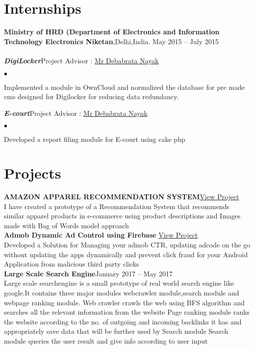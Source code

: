\documentclass[margin,line]{res}
\newenvironment{list2}{
  \begin{list}{$\bullet$}{%
      \setlength{\itemsep}{0in}
      \setlength{\parsep}{0in} \setlength{\parskip}{0in}
      \setlength{\topsep}{0in} \setlength{\partopsep}{0in}
      \setlength{\leftmargin}{0.2in}}}{\end{list}}
\begin{document}
\begin{resume}
\section{\sc Internships}
{\bf 
Ministry of HRD (Department of Electronics and Information Technology Electronics Niketan},Delhi,India. \hfill{May 2015 -- July 2015}\\\\
{\em \bf DigiLocker}\hfill {Project Advisor : \href {https://www.linkedin.com/in/debabrata-nayak-a911397b/}{ Mr Debabrata Nayak}}
\begin{list2} %
\item  Implemented a module in OwnCloud  and normalized the database for pre made cms designed for Digilocker for reducing data  redundancy.\\
\end{list2}
{\em \bf E-court}\hfill {Project Advisor : \href {https://www.linkedin.com/in/debabrata-nayak-a911397b/}{ Mr Debabrata Nayak}}
\begin{list2} %
\item Developed a report filing module for E-court using cake php \\
\end{list2}

\section{\sc Projects}
{\bf AMAZON APPAREL RECOMMENDATION SYSTEM}\hfill \href{https://github.com/sagunesh/AMAZON-APPAREL-RECOMMENDATION-SYSTEM}{View Project}\\
I have created a prototype of a Recommendation System that recommends similar apparel products in e-commerce using product descriptions and Images made with Bag of Words model approach\\

{\bf Admob Dynamic Ad Control using Firebase} \hfill \href{ https://github.com/sagunesh/Admob-Ad-Control}{View Project}\\
Developed a Solution for Managing your admob CTR, updating adcode on the go without updating the apps dynamically and prevent click fraud for your Android Application from malicious third party clicks\\

{\bf Large Scale Search Engine}\hfill{January 2017 -- May 2017}\\
Large scale searchengine is a small prototype of real world search engine like google.It contains three major modules 
webcrawler module,search module and webpage ranking module.
Web crawler crawls the web using BFS algorithm and searches all the relevant information  from the website 
Page ranking module ranks the website according to the no. of outgoing and incoming backlinks it has and appropriately save data that will be further used by Search module
Search module queries the user result and give info according to user input\\


\end{resume}
\end{document}

